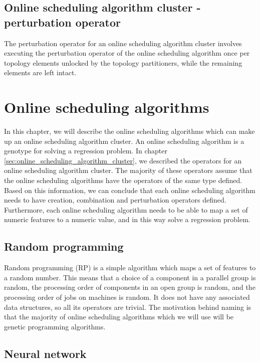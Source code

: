 \subsection{Online scheduling algorithm cluster - perturbation operator}
The perturbation operator for an online scheduling algorithm cluster involves executing the perturbation operator of the online scheduling algorithm once per topology elements unlocked by the topology partitioners, while the remaining elements are left intact.

\section{Online scheduling algorithms}
\label{sec:online_scheduling_algorithms}

In this chapter, we will describe the online scheduling algorithms which can make up an online scheduling algorithm cluster. An online scheduling algorithm is a genotype for solving a regression problem. In chapter \ref{sec:online_scheduling_algorithm_cluster}, we described the operators for an online scheduling algorithm cluster. The majority of these operators assume that the online scheduling algorithms have the operators of the same type defined. Based on this information, we can conclude that each online scheduling algorithm needs to have creation, combination and perturbation operators defined. Furthermore, each online scheduling algorithm needs to be able to map a set of numeric features to a numeric value, and in this way solve a regression problem.

\subsection{Random programming}

Random programming (RP) is a simple algorithm which maps a set of features to a random number. This means that a choice of a component in a parallel group is random, the processing order of components in an open group is random, and the processing order of jobs on machines is random. It does not have any associated data structures, so all its operators are trivial. The motivation behind naming is that the majority of online scheduling algorithms which we will use will be genetic programming algorithms.

\subsection{Neural network}

